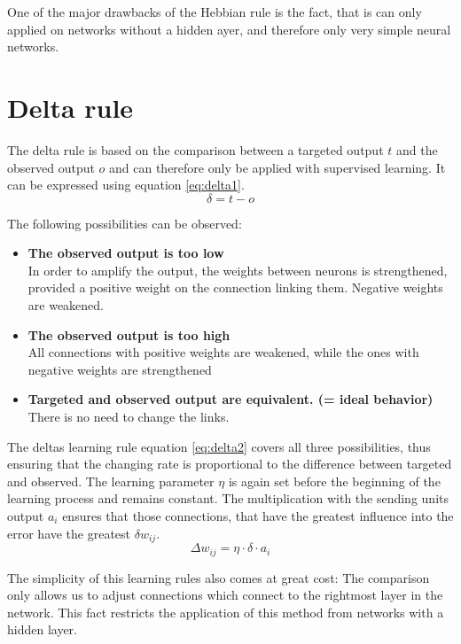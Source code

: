 \documentclass[10pt,a4paper,DIV=11]{scrreprt}
\begin{document}
One of the major drawbacks of the Hebbian rule is the fact, that is can only applied on networks without a hidden ayer, and therefore only very simple neural networks.

\section{Delta rule}
The delta rule is based on the comparison between a targeted output $t$ and the observed output $o$ and can therefore only be applied with supervised learning.
It can be expressed using equation \eqref{eq:delta1}.
\begin{equation}
\delta = t - o
\label{eq:delta1}
\end{equation}

The following possibilities can be observed:
\begin{itemize}
\item \textbf{The observed output is too low}\\
In order to amplify the output, the weights between neurons is strengthened, provided a positive weight on the connection linking them. Negative weights are weakened.
\item \textbf{The observed output is too high}\\
All connections with positive weights are weakened, while the ones with negative weights are strengthened 
\item \textbf{Targeted and observed output are equivalent. (= ideal behavior)}\\ There is no need to change the links.
\end{itemize}

The deltas learning rule equation \eqref{eq:delta2} covers all three possibilities, thus ensuring that the changing rate is proportional to the difference between targeted and 
observed. The learning parameter $\eta$ is again set before the beginning of the learning process and remains constant. The multiplication with the sending units output $a_i$ 
ensures that those connections, that have the greatest influence into the error have the greatest $\delta w_{ij}$.
\begin{equation}
\Delta w_{ij} = \eta \cdot \delta \cdot a_i
\label{eq:delta2}
\end{equation}

The simplicity of this learning rules also comes at great cost: The comparison only allows us to adjust connections which connect to the rightmost layer in the network. 
This fact restricts the application of this method from networks with a hidden layer. 
\end{document}
